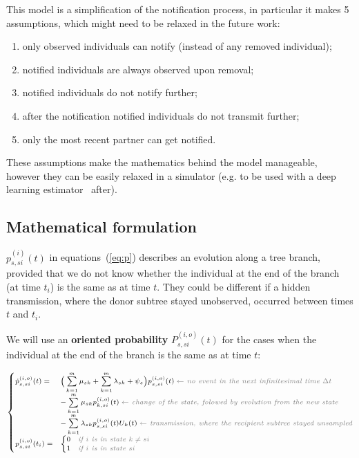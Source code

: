 \documentclass[a4paper,10pt]{article}
\begin{document}
This model is a simplification of the notification process, in particular it makes 5 assumptions, which might need to be relaxed in the future work:
\begin{enumerate}
\item only observed individuals can notify (instead of any removed individual);
\item notified individuals are always observed upon removal;
\item notified individuals do not notify further;
\item after the notification notified individuals do not transmit further;
\item only the most recent partner can get notified.
\end{enumerate}

These assumptions make the mathematics behind the model manageable, however they can be easily relaxed in a simulator (e.g. to be used with a deep learning estimator~\cite{Voznica2021} after).

\subsection{Mathematical formulation}
$p_{s,si}^{(i)}(t)$ in equations~(\ref{eq:p}) describes an evolution along a tree branch, provided that we do not know whether the individual at the end of the branch (at time $t_i$) is the same as at time $t$. They could be different if a hidden transmission, where the donor subtree stayed unobserved, occurred between times $t$ and $t_i$.

We will use an \textbf{oriented probability} $P^{(i,o)}_{s,si}(t)$ for the cases when the individual at the end of the branch is the same as at time $t$:

\begin{equation}
\scriptsize
\begin{cases}
\dot{p}_{s,si}^{(i,o)}(t) = & \Big(\sum\limits_{k=1}^{m} \mu_{sk} + \sum\limits_{k=1}^{m} \lambda_{sk} + \psi_s\Big) p_{s,si}^{(i,o)}(t)\; \textit{\color{gray} $\leftarrow$ no event in the next infinitesimal time $\Delta t$ }\\
    & - \sum\limits_{k=1}^{m} \mu_{sk} p_{k,si}^{(i,o)}(t)\;  \textit{\color{gray} $\leftarrow$ change of the state, folowed by evolution from the new state }\\
    & - \sum\limits_{k=1}^{m} \lambda_{sk} p_{s,si}^{(i,o)}(t)U_{k}(t)\;  \textit{\color{gray} $\leftarrow$ transmission, where the recipient subtree stayed unsampled}\\
p_{s,si}^{(i,o)}(t_i) = & 
    \begin{cases}
    0 & \textit{\color{gray} if $i$ is in state $k \neq si$}\\
    1 & \textit{\color{gray} if $i$ is in state $si$}
    \end{cases}\label{eq:p-o}
\end{cases}
\end{equation}
\end{document}
